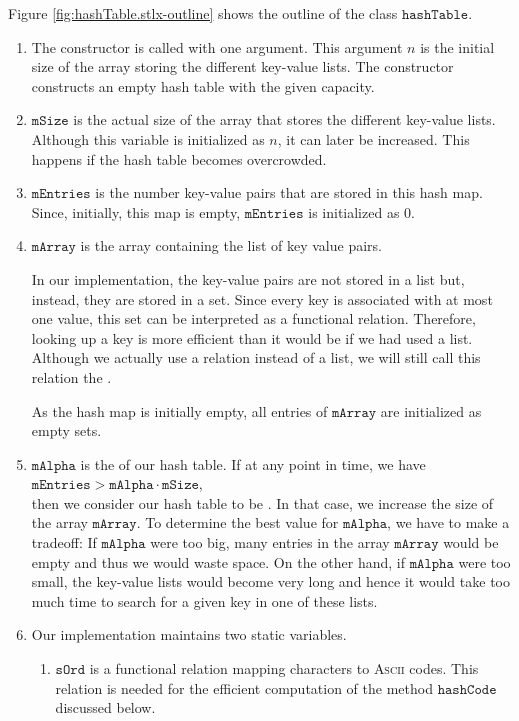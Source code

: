 Figure \ref{fig:hashTable.stlx-outline} shows the outline of the class $\mathtt{hashTable}$.  
\begin{enumerate}
\item The constructor is called with one argument.  This argument $n$ is the initial size
      of the array storing the different key-value lists.  The constructor constructs an empty hash
      table with the given capacity.
\item $\mathtt{mSize}$ is the actual size of the array that stores the different key-value lists.
      Although this variable is initialized as $n$, it can later be increased.  This happens
      if the hash table becomes overcrowded.
\item $\mathtt{mEntries}$ is the number key-value pairs that are stored in this hash map.
      Since, initially, this map is empty, $\mathtt{mEntries}$ is  initialized as $0$.
\item $\mathtt{mArray}$ is the array containing the list of key value pairs.

      In our implementation, the key-value pairs are not stored in a list but, instead, they are
      stored in a set.  Since every key is associated with at most one value, this set can be interpreted as a
      functional relation.  Therefore, looking up a key is more efficient than it would be if we had
      used a list.  Although we actually use a relation instead of a list, we will still call
      this relation the .

      As the hash map is initially empty, all entries of $\mathtt{mArray}$ are initialized as empty sets.
\item $\mathtt{mAlpha}$ is the  of our hash table.  If at any point in time, we have
      \\[0.2cm]
      \hspace*{1.3cm}
      $\mathtt{mEntries} > \mathtt{mAlpha} \cdot \mathtt{mSize}$,
      \\[0.2cm]
      then we consider our hash table to be .  In that case, we increase the size
      of the array $\mathtt{mArray}$.  To determine the best value for $\mathtt{mAlpha}$, we have to
      make a tradeoff:  If $\mathtt{mAlpha}$ were too big, many entries in the array $\mathtt{mArray}$
      would be empty and thus we would waste space.  On the other hand, if $\mathtt{mAlpha}$ were too
      small, the key-value lists would become very long and hence it would take too much time to
      search for a given key in one of these lists.
\item Our implementation maintains two static variables.
  \begin{enumerate}
  \item $\mathtt{sOrd}$ is a functional relation mapping characters to \textsc{Ascii} codes.
        This relation is needed for the efficient computation of the method $\mathtt{hashCode}$
        discussed below.


\end{enumerate}
\end{enumerate}
